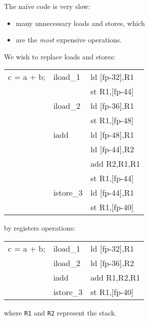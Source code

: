 \begin{slide*}
\renewcommand{\arraystretch}{0.9}
The na\"ive code is very slow:

\begin{itemize}
\item many unnecessary loads and stores, which
\item are the {\em most\/} expensive operations.
\end{itemize}
\vspace*{2em}

We wish to replace loads and stores:
\begin{center}
\begin{scriptsize}
\begin{tt}
\begin{tabular}{l@{~~~}l@{~~~}l}
c = a + b;      &        iload\_1      &      ld [fp-32],R1\\
                &                     &      st R1,[fp-44]\\
                &        iload\_2      &      ld [fp-36],R1\\
                &                     &      st R1,[fp-48]\\
                &        iadd         &      ld [fp-48],R1\\
                &                     &      ld [fp-44],R2\\
                &                     &      add R2,R1,R1\\
                &                     &      st R1,[fp-44]\\
                &        istore\_3     &      ld [fp-44],R1\\
                &                     &      st R1,[fp-40]
\end{tabular}
\end{tt}
\end{scriptsize}
\end{center}

by registers operations:

\begin{center}
\begin{scriptsize}
\begin{tt}
\begin{tabular}{l@{~~~}l@{~~~}l}
c = a + b;       &       iload\_1     &       ld [fp-32],R1\\
                 &       iload\_2     &       ld [fp-36],R2\\
                 &       iadd        &       add R1,R2,R1\\
                 &       istore\_3    &       st R1,[fp-40]
\end{tabular}
\end{tt}
\end{scriptsize}
\end{center}
where {\tt R1} and {\tt R2} represent the stack.
\vfil
\renewcommand{\arraystretch}{1}
\end{slide*}
 

